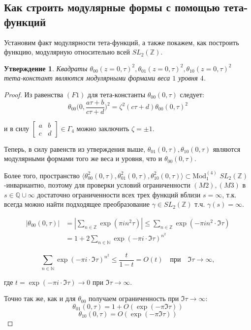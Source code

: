 \documentclass{article}
\newcommand{\ZZ}{\mathbb{Z}}
\newcommand{\NN}{\mathbb{N}}
\newcommand{\QQ}{\mathbb{Q}}
\theoremstyle{break}
\newtheorem{claim}{Утверждение}[section]
\newcommand{\ModkN}[2]{\text{Mod}_{#1}^{(#2)}}
\begin{document}
\subsection{Как строить модулярные формы с помощью тета-функций} 
Установим факт модулярности тета-функций, а также покажем, как построить функцию, модулярную относительно всей $SL_2(\ZZ)$.
\begin{claim}
	Квадраты $\theta_{00}(z=0, \tau)^2, \theta_{01}(z=0, \tau)^2, \theta_{10}(z=0, \tau)^2$ тета-констант являются модулярными формами веса $1$ уровня $4$.
\end{claim}
\begin{proof}
	Из равенства $(F1)$ для тета-константы $\theta_{00}(0, \tau)$ следует:
	\begin{equation}
		\theta_{00}\Big(0, \frac{a \tau + b}{c \tau + d}\Big)^2 =
		\zeta^2 (c\tau + d) \theta_{00}(0, \tau)^2
	\end{equation}
	
	и в силу $\begin{bmatrix}
		a & b \\ c & d
	\end{bmatrix} \in \Gamma_4$ можно заключить $\zeta=\pm 1$.

	
	Теперь, в силу равенств из утверждения выше, $\theta_{01}(0, \tau), \theta_{10}(0, \tau)$
	 являются модулярными формами того же веса и уровня, что и $\theta_{00}(0, \tau)$.
	 
	Более того, пространство 
	$\langle 
	\theta^2_{00}(0, \tau), \theta^2_{01}(0, \tau), \theta^2_{10}(0, \tau) \rangle
	\subset \ModkN{1}{4}
	$
	$SL_2(\ZZ)$-инвариантно, поэтому
	для проверки условий ограниченности $(M2),(M3)$ в $s \in \QQ \cup \infty$ достаточно ограниченности всех трех функций
	вблизи $s = \infty$, т.к. всегда можно найти подходящее преобразование 
	$\gamma \in SL_2(\ZZ)$ т.ч. $\gamma(s)=\infty$.
	
\begin{align}
		|\theta_{00}(0, \tau)| 
		&= |\sum_{n \in \ZZ} \exp(\pi i n^2 \tau)|
		\le \sum_{n \in \ZZ} \exp(-\pi i n^2 \cdot \Im \tau) \\ \nonumber
		&= 1 + 2 \sum_{n \in \NN} \exp(-\pi i \cdot \Im \tau) ^ {n^2}
\end{align}

\begin{equation}
			\sum_{n \in \NN} \exp(-\pi i \cdot \Im \tau) ^ {n^2} \le \frac{t}{1-t} = O(t) \quad \text{при} \quad \Im \tau \to \infty,
\end{equation}

	где $t=\exp(-\pi i \cdot \Im \tau) \to 0$ при $\Im \tau \to \infty$.

	Точно так же, как и для $\theta_{00}$ получаем ограниченность при $\Im \tau \to \infty$:
	\begin{equation}
	\theta_{01}(0, \tau) = 1 + O(\exp(-\pi \Im \tau))
	\end{equation}
	\begin{equation}
		\theta_{10}(0, \tau) = O(\exp(-\pi \Im \tau))
	\end{equation}
\end{proof}
\end{document}
